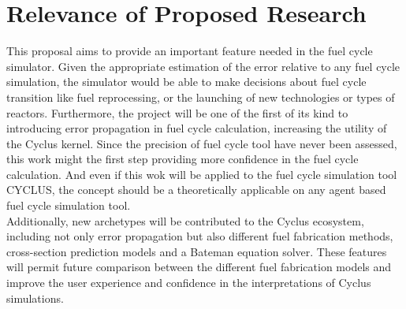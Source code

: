 \documentclass[dvips,12pt]{article}
\begin{document}


\section{Relevance of Proposed Research}
This proposal aims to provide an important feature
needed in the fuel cycle simulator.  Given the
appropriate estimation of the error relative to
any fuel cycle simulation, the simulator would be
able to make decisions about fuel cycle transition
like fuel reprocessing, or the launching of new
technologies or types of reactors. Furthermore,
the project will be one of the first of its kind
to introducing error propagation in fuel cycle
calculation, increasing the utility of the Cyclus
kernel. Since the precision of fuel cycle tool
have never been assessed, this work might the
first step providing more confidence in the fuel
cycle calculation. And even if this wok will be
applied to the fuel cycle simulation tool CYCLUS,
the concept should be a theoretically applicable
on any agent based fuel cycle simulation
tool.\\ 
Additionally, new archetypes will be contributed
to the Cyclus ecosystem, including not only error
propagation but also different fuel fabrication
methods, cross-section prediction models and a
Bateman equation solver. These features will
permit future comparison between the different
fuel fabrication models and improve the user
experience and confidence in the interpretations
of Cyclus simulations.
\end{document}
